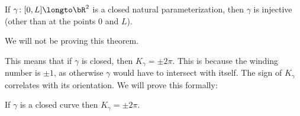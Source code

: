 \begin{thrm*}

    If $\gamma\colon[0,L]\longto\bR^2$ is a closed natural parameterization, then $\gamma$ is injective (other than at the points $0$ and $L$).

\end{thrm*}

We will not be proving this theorem.

This means that if $\gamma$ is closed, then $K_\gamma=\pm2\pi$.
This is because the winding number is $\pm1$, as otherwise $\gamma$ would have to intersect with itself.
The sign of $K_\gamma$ correlates with its orientation.
We will prove this formally:

\begin{prop*}

    If $\gamma$ is a closed curve then $K_\gamma=\pm2\pi$.

\end{prop*}

